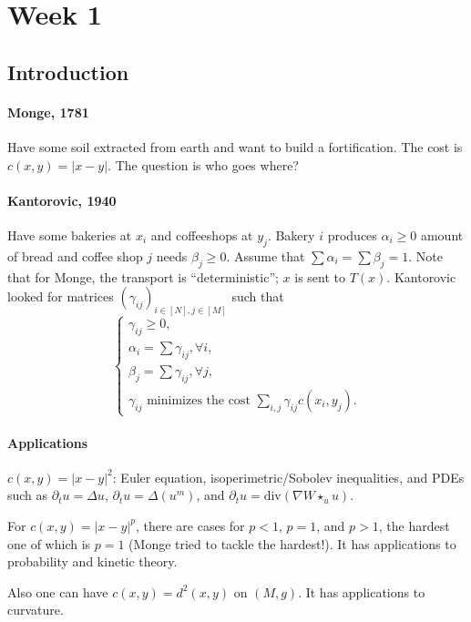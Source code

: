 
\section{Week 1}
\subsection{Introduction}
\paragraph{Monge, 1781} Have some soil extracted from earth and want to build a fortification. The cost is $c(x,y) = |x-y|$. The question is who goes where?

\paragraph{Kantorovic, 1940} Have some bakeries at $x_i$ and coffeeshops at $y_j$. Bakery $i$ produces $\alpha_i \geq 0$ amount of bread and coffee shop $j$ needs $\beta_j \geq 0$. Assume that $\sum \alpha_i = \sum \beta_j =  1$. Note that for Monge, the transport is ``deterministic''; $x$ is sent to $T(x)$. Kantorovic looked for matrices $(\gamma_{ij})_{i\in [N], j\in [M]}$ such that
\[
    \left\{ \begin{array}{l}
            \gamma_{ij} \geq 0, \\
            \alpha_i = \sum \gamma_{ij}, \forall i, \\
            \beta_j = \sum \gamma_{ij}, \forall j,\\
            \gamma_{ij} \text{ minimizes the cost } \sum_{i,j} \gamma_{ij}c(x_i, y_j).
    \end{array} \right.
\] 

\paragraph{Applications} $c(x,y) = |x-y|^2$: Euler equation, isoperimetric/Sobolev inequalities, and PDEs such as $\partial_t u = \Delta u$, $\partial_t u = \Delta(u^m)$, and $\partial_t u = \mathrm{div}(\nabla W \star_u u)$. 

For $c(x,y) = |x-y|^p$, there are cases for $p < 1$, $p=1$, and $p > 1$, the hardest one of which is $p=1$ (Monge tried to tackle the hardest!). It has applications to probability and kinetic theory.

Also one can have $c(x,y) = d^2(x,y)$ on $(M,g)$. It has applications to curvature. 

